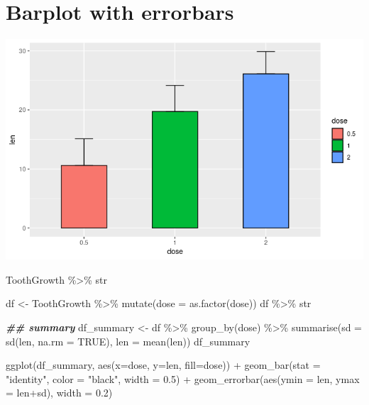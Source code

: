\documentclass[
]{book}
\newenvironment{Shaded}{\begin{snugshade}}{\end{snugshade}}
\newcommand{\AttributeTok}[1]{\textcolor[rgb]{0.77,0.63,0.00}{#1}}
\newcommand{\ConstantTok}[1]{\textcolor[rgb]{0.00,0.00,0.00}{#1}}
\newcommand{\DocumentationTok}[1]{\textcolor[rgb]{0.56,0.35,0.01}{\textbf{\textit{#1}}}}
\newcommand{\FloatTok}[1]{\textcolor[rgb]{0.00,0.00,0.81}{#1}}
\newcommand{\FunctionTok}[1]{\textcolor[rgb]{0.00,0.00,0.00}{#1}}
\newcommand{\NormalTok}[1]{#1}
\newcommand{\OtherTok}[1]{\textcolor[rgb]{0.56,0.35,0.01}{#1}}
\newcommand{\SpecialCharTok}[1]{\textcolor[rgb]{0.00,0.00,0.00}{#1}}
\newcommand{\StringTok}[1]{\textcolor[rgb]{0.31,0.60,0.02}{#1}}
\begin{document}
\hypertarget{barplot-with-errorbars}{%
\section{Barplot with errorbars}\label{barplot-with-errorbars}}

\includegraphics{images/10/00000e.png}

\begin{Shaded}
\begin{Highlighting}[]
\NormalTok{ToothGrowth }\SpecialCharTok{\%\textgreater{}\%}\NormalTok{ str}

\NormalTok{df }\OtherTok{\textless{}{-}}\NormalTok{ ToothGrowth }\SpecialCharTok{\%\textgreater{}\%} 
  \FunctionTok{mutate}\NormalTok{(}\AttributeTok{dose =} \FunctionTok{as.factor}\NormalTok{(dose))}
\NormalTok{df }\SpecialCharTok{\%\textgreater{}\%}\NormalTok{ str}

\DocumentationTok{\#\# summary}
\NormalTok{df\_summary }\OtherTok{\textless{}{-}}\NormalTok{ df }\SpecialCharTok{\%\textgreater{}\%}
  \FunctionTok{group\_by}\NormalTok{(dose) }\SpecialCharTok{\%\textgreater{}\%}
  \FunctionTok{summarise}\NormalTok{(}\AttributeTok{sd =} \FunctionTok{sd}\NormalTok{(len, }\AttributeTok{na.rm =} \ConstantTok{TRUE}\NormalTok{), }\AttributeTok{len =} \FunctionTok{mean}\NormalTok{(len))}
\NormalTok{df\_summary}


\FunctionTok{ggplot}\NormalTok{(df\_summary, }\FunctionTok{aes}\NormalTok{(}\AttributeTok{x=}\NormalTok{dose, }\AttributeTok{y=}\NormalTok{len, }\AttributeTok{fill=}\NormalTok{dose)) }\SpecialCharTok{+}
  \FunctionTok{geom\_bar}\NormalTok{(}\AttributeTok{stat =} \StringTok{"identity"}\NormalTok{, }\AttributeTok{color =} \StringTok{"black"}\NormalTok{, }\AttributeTok{width =} \FloatTok{0.5}\NormalTok{) }\SpecialCharTok{+}
  \FunctionTok{geom\_errorbar}\NormalTok{(}\FunctionTok{aes}\NormalTok{(}\AttributeTok{ymin =}\NormalTok{ len, }\AttributeTok{ymax =}\NormalTok{ len}\SpecialCharTok{+}\NormalTok{sd), }\AttributeTok{width =} \FloatTok{0.2}\NormalTok{) }
\end{Highlighting}
\end{Shaded}
\end{document}
